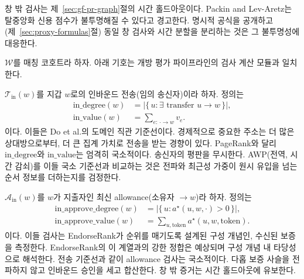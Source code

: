 창 밖 검사는 제~\ref{sec:gf-pr-graph}절의 시간 홀드아웃이다. Packin and Lev-Aretz는 탈중앙화 신용 점수가 불투명해질 수 있다고 경고한다. 명시적 공식을 공개하고(제~\ref{sec:proxy-formulas}절) 동일 창 검사와 시간 분할을 분리하는 것은 그 불투명성에 대응한다.


$\mathcal{W}$를 매칭 코호트라 하자. 아래 기호는 개방 평가 파이프라인의 검사 계산 모듈과 일치한다.


$\mathcal{T}_{\mathrm{in}}(w)$를 지갑 $w$로의 인바운드 전송(임의 송신자)이라 하자. 정의는
\begin{align}
\mathrm{in\_degree}(w)
&=
\bigl|\{\,u : \exists\text{ transfer }u\to w\,\}\bigr|,
\label{eq:in-degree}\\
\mathrm{in\_value}(w)
&=
\sum_{e:\,\cdot\to w} v_e.
\label{eq:in-value}
\end{align}
이다. 이들은 Do et al.의 도메인 직관 기준선이다. 경제적으로 중요한 주소는 더 많은 상대방으로부터, 더 큰 집계 가치로 전송을 받는 경향이 있다. PageRank와 달리 $\mathrm{in\_degree}$와 $\mathrm{in\_value}$는 엄격히 국소적이다. 송신자의 평판을 무시한다. AWP(전역, 시간 감쇠)를 이들 국소 기준선과 비교하는 것은 전파와 최근성 가중이 원시 유입을 넘는 순서 정보를 더하는지를 검정한다.


$\mathcal{A}_{\mathrm{in}}(w)$를 $w$가 지출자인 최신 allowance(소유자 $\to w$)라 하자. 정의는
\begin{align}
\mathrm{in\_approve\_degree}(w)
&=
\bigl|\{\,u : a^{\star}(u,w,\cdot)>0\,\}\bigr|,
\label{eq:in-approve-degree}\\
\mathrm{in\_approve\_value}(w)
&=
\sum_{u,\mathrm{token}} a^{\star}(u,w,\mathrm{token}).
\label{eq:in-approve-value}
\end{align}
이다. 이들 검사는 EndorseRank가 순위를 매기도록 설계된 구성 개념인, 수신된 보증을 측정한다. EndorseRank의 이 계열과의 강한 정합은 예상되며 구성 개념 내 타당성으로 해석한다. 전송 기준선과 같이 allowance 검사는 국소적이다. 다홉 보증 사슬을 전파하지 않고 인바운드 승인을 세고 합산한다. 창 밖 증거는 시간 홀드아웃에 유보한다.


